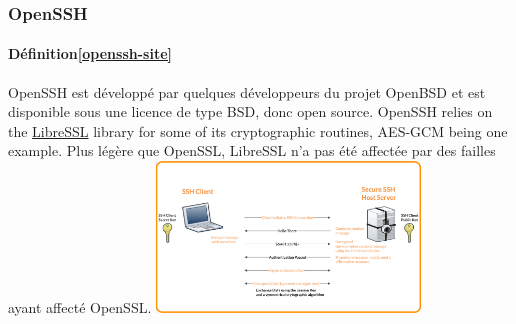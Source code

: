 \documentclass{beamer}
\begin{document}
    \begin{frame}
        \transdissolve
        \frametitle{OpenSSH}
        \framesubtitle{Définition\cref{openssh-site}}
        OpenSSH est développé par quelques développeurs du projet OpenBSD et est disponible sous une licence de type BSD, donc open source.
        \bigbreak
        OpenSSH relies on the \href{https://www.libressl.org}{LibreSSL} library for some of its cryptographic routines, AES-GCM being one example.
        Plus légère que OpenSSL, LibreSSL n'a pas été affectée par des failles ayant affecté OpenSSL.
        \bigbreak
        \centering
        \includegraphics[width=7cm]{image/ssh-key-diagram}
    \end{frame}
\end{document}
